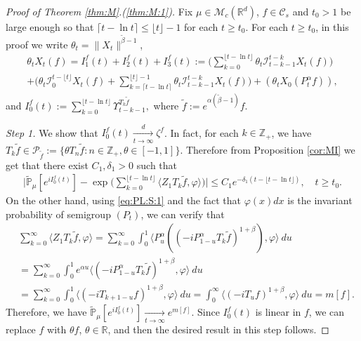\documentclass[12pt,a4paper]{amsart}
\theoremstyle{plain}
\theoremstyle{definition}
\numberwithin{equation}{section}
\begin{document}
\begin{proof}[Proof of Theorem \ref{thm:M}.(\ref{thm:M:1})]
	Fix $\mu\in \mathcal M_c(\mathbb R^d)$, $f\in \mathcal C_s$ and $t_0 > 1$ be large enough so that $ \lceil t - \ln t\rceil \leq \lfloor t \rfloor - 1$ for each $t\geq t_0$.
  For each $t\geq t_0$, in this proof we write $\theta_t = \|X_t\|^{\tilde \beta - 1}$, 
  \begin{multline} 
    \label{eq:PM:CLTS:1}
    \theta_t  X_t(f)    
    = I^f_1(t) + I^f_2(t) + I^f_3(t)
    := \Big(\sum_{k=0}^{\lfloor t-\ln t \rfloor} \theta_t \mathcal I_{t-k-1}^{t-k} X_t(f) \Big)\\
    + \Big( \theta_t \mathcal I_0^{t-\lfloor t \rfloor} X_t(f)   + \sum_{k=\lceil t-\ln t \rceil}^{\lfloor t \rfloor-1} \theta_t \mathcal I_{t-k-1}^{t-k} X_t(f) \Big) + (\theta_t X_0(P_t^\alpha f) ),
\end{multline}
and
\(    
 I^f_0(t)
 := \sum_{k=0}^{\lfloor t-\ln t \rfloor} \Upsilon_{t-k-1}^{T_k \tilde f},
\)  
where $\tilde f:= e^{\alpha(\tilde \beta - 1)} f$.

  \emph{Step 1.} We show that $I^f_0(t) \xrightarrow[t\to \infty]{d} \zeta^f$. 
  In fact, for each $k \in \mathbb Z_+$, we have  $T_{k} \tilde f \in \mathcal P_{\tilde f}:=\{\theta T_n \tilde f: n \in \mathbb Z_+, \theta \in [-1,1]\}$. 
  Therefore from Proposition \ref{cor:MI} we get that there exist $C_1,\delta_1 > 0$ such that
  \begin{align}
    \Big|\mathbb{\widetilde{P}}_{\mu} [e^{i I^f_0(t)} ]-\exp\Big(\sum_{k=0}^{\lfloor t-\ln t \rfloor} \langle Z_1T_{k}\tilde f, \varphi\rangle \Big)\Big|
    \leq C_1 e^{-\delta_1(t - \lfloor t - \ln t\rfloor)},
    \quad t\geq t_0.
  \end{align}
  On the other hand, using \eqref{eq:PL:S:1} and the fact that $\varphi(x)dx$ is the invariant probability of semigroup $(P_t)$, we can verify that
  \begin{align}
    \label{eq:PM:CLTS:2}
    & \sum_{k=0}^\infty \langle Z_1 T_{k} \tilde f, \varphi \rangle
    = \sum_{k=0}^\infty \int_0^1 \langle P_u^\alpha ((-iP_{1 - u}^\alpha T_k \tilde f)^{1+\beta}), \varphi\rangle ~du
    \\& = \sum_{k=0}^\infty \int_0^1 e^{\alpha u} \langle  (-iP_{1 - u}^\alpha T_{k}\tilde f)^{1+\beta}, \varphi \rangle ~du
    \\& = \sum_{k=0}^\infty \int_0^1 \langle  (-iT_{k+1 - u} f)^{1+\beta}, \varphi\rangle~du
    = \int_0^\infty \langle  (-iT_{u} f)^{1+\beta}, \varphi\rangle~du = m[f].
  \end{align}
  Therefore, we have $\mathbb{\widetilde{P}}_{\mu} [e^{i I^f_0(t)} ] \xrightarrow[t\to \infty]{} e^{m[f]}$. Since $I_0^f(t)$ is linear in $f$, we can replace $f$ with $\theta f$, $\theta \in \mathbb R$, and then the desired result in this step follows.


\end{proof}
\end{document}
